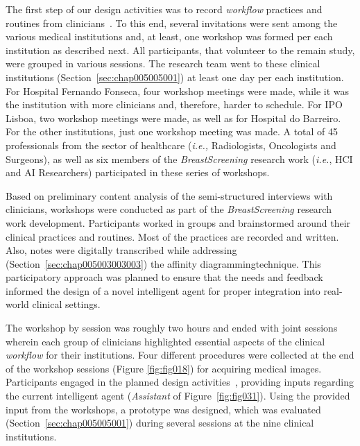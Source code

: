 The first step of our design activities was to record {\it workflow} practices and routines from clinicians~\cite{Hoiseth:2013:DHG:2485760.2485770, Hoiseth:2013:RGD:2468356.2468436}.
To this end, several invitations were sent among the various medical institutions and, at least, one workshop was formed per each institution as described next.
All participants, that volunteer to the remain study, were grouped in various sessions.
The research team went to these clinical institutions (Section~\ref{sec:chap005005001}) at least one day per each institution.
For Hospital Fernando Fonseca, four workshop meetings were made, while it was the institution with more clinicians and, therefore, harder to schedule.
For IPO Lisboa, two workshop meetings were made, as well as for Hospital do Barreiro.
For the other institutions, just one workshop meeting was made.
A total of 45 professionals from the sector of healthcare ({\it i.e.,} Radiologists, Oncologists and Surgeons), as well as six members of the {\it BreastScreening} research work ({\it i.e.}, \ac{HCI} and \ac{AI} Researchers) participated in these series of workshops.

Based on preliminary content analysis of the semi-structured interviews with clinicians, workshops were conducted as part of the {\it BreastScreening} research work development.
Participants worked in groups and brainstormed around their clinical practices and routines.
Most of the practices are recorded and written.
Also, notes were digitally transcribed while addressing (Section~\ref{sec:chap005003003003}) the affinity diagramming\footnotemark[30] technique.
This participatory approach was planned to ensure that the needs and feedback informed the design of a novel intelligent agent for proper integration into real-world clinical settings.


The workshop by session was roughly two hours and ended with joint sessions wherein each group of clinicians highlighted essential aspects of the clinical {\it workflow} for their institutions.
Four different procedures were collected at the end of the workshop sessions (Figure \ref{fig:fig018}) for acquiring medical images.
Participants engaged in the planned design activities~\cite{https://doi.org/10.13140/rg.2.2.16566.14403/1}, providing inputs regarding the current intelligent agent ({\it Assistant} of Figure~\ref{fig:fig031}).
Using the provided input from the workshops, a prototype was designed, which was evaluated (Section~\ref{sec:chap005005001}) during several sessions at the nine clinical institutions.

